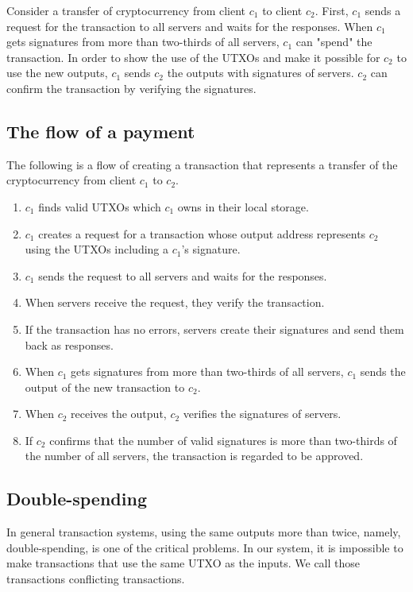 \documentclass[a4paper, oneside]{discothesis}
\begin{document}
Consider a transfer of cryptocurrency from client $c_1$ to client $c_2$.
First, $c_1$ sends a request for the transaction to all servers and waits for the responses.
When $c_1$ gets signatures from more than two-thirds of all servers,
$c_1$ can "spend" the transaction.
In order to show the use of the UTXOs and make it possible for $c_2$ to use the new outputs,
$c_1$ sends $c_2$ the outputs with signatures of servers.
$c_2$ can confirm the transaction by verifying the signatures.

\subsection{The flow of a payment}
The following is a flow of creating a transaction
that represents a transfer of the cryptocurrency from client $c_1$ to $c_2$.

\begin{enumerate}
    \item $c_1$ finds valid UTXOs which $c_1$ owns in their local storage.
    \item $c_1$ creates a request for a transaction whose output address represents $c_2$ using the UTXOs including a $c_1$'s signature.
    \item $c_1$ sends the request to all servers and waits for the responses.
    \item When servers receive the request, they verify the transaction.
    \item If the transaction has no errors,
        servers create their signatures and send them back as responses.
    \item When $c_1$ gets signatures from more than two-thirds of all servers,
        $c_1$ sends the output of the new transaction to $c_2$.
    \item When $c_2$ receives the output, $c_2$ verifies the signatures of servers.
    \item If $c_2$ confirms that the number of valid signatures is more than two-thirds
        of the number of all servers, the transaction is regarded to be approved.
\end{enumerate}


\subsection{Double-spending}
In general transaction systems, using the same outputs more than twice,
namely, double-spending, is one of the critical problems.
In our system, it is impossible to make transactions that use the same UTXO as the inputs.
We call those transactions conflicting transactions.
\end{document}
